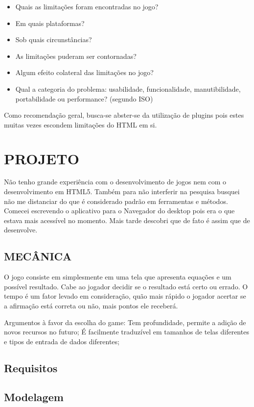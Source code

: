 \documentclass[
12pt,
a4paper,
portuges,
draft
]{report}
\begin{document}
\begin{itemize}
\item Quais as limitações foram encontradas no jogo?
\item Em quais plataformas?
\item Sob quais circunstâncias?
\item As limitações puderam ser contornadas?
\item Algum efeito colateral das limitações no jogo?
\item Qual a categoria do problema: usabilidade, funcionalidade, manutibilidade, portabilidade ou performance? (segundo ISO)
\end{itemize}

Como recomendação geral, busca-se abster-se da utilização de plugins
pois estes muitas vezes escondem limitações do HTML em si.
\chapter{PROJETO}
\thispagestyle{myheadings}

Não tenho grande experiência com o desenvolvimento de jogos nem com
o desenvolvimento em HTML5. Também para não interferir na pesquisa
busquei não me distanciar do que é considerado padrão em ferramentas
e métodos.
Comecei escrevendo o aplicativo para o Navegador do desktop pois era o
que estava mais acessível no momento. Mais tarde descobri que de fato
é assim que de desenvolve.

\section{MECÂNICA}
O jogo consiste em simplesmente em uma tela que apresenta equações e
um possível resultado. Cabe ao jogador decidir se o resultado está
certo ou errado. O tempo é um fator levado em consideração, quão
mais rápido o jogador acertar se a afirmação está correta ou não,
mais pontos ele receberá.

Argumentos à favor da escolha do game: Tem profundidade, permite a
adição de novos recursos no futuro;
É facilmente traduzível em tamanhos de telas diferentes e tipos de
entrada de dados diferentes;

\section{Requisitos}
\section{Modelagem}
\end{document}
